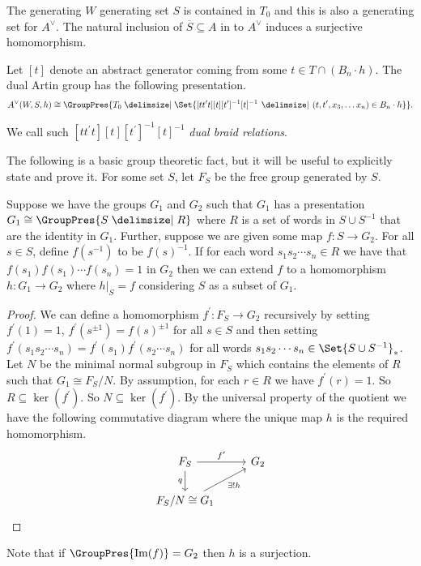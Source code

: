 \begin{theorem}
	The generating $W$ generating set $S$ is contained in $T_0$ and this is also a generating set for $A^\vee$.
	The natural inclusion of $\overline{S} \subseteq A$ in to $A^\vee$ induces a surjective homomorphism.
	\label{thm:homo_art_to_dual_art}
\end{theorem}

\begin{theorem}
	Let $[t]$ denote an abstract generator coming from some $t \in T \cap(B_n \cdot h)$.
	The dual Artin group has the following presentation.
	\[
		A^\vee(W,S,h) \cong \GroupPres{T_0 \relations \Set{ [t t^\prime t][t][t^\prime]^{-1}[t]^{-1} \given (t,t^\prime,x_3, \ldots x_n) \in B_n \cdot h}}
		.\]
	\label{thm:dual_braid_relations}
\end{theorem}

We call such $[t t^\prime t][t][t^\prime]^{-1}[t]^{-1}$ \emph{dual braid relations}.

The following is a basic group theoretic fact, but it will be useful to explicitly state and prove it.
For some set $S$, let $F_S$ be the free group generated by $S$.
\begin{lemma}
	Suppose we have the groups $G_1$ and $G_2$ such that $G_1$ has a presentation $G_1 \cong \GroupPres{S \relations R}$ where $R$ is a set of words in $S \cup S^{-1}$ that are the identity in $G_1$.
	Further, suppose we are given some map $f \colon S \to G_2$.
	For all $s \in S$, define $f(s^{-1})$ to be $f(s)^{-1}$.
	If for each word $s_1s_2 \cdots s_n \in R$ we have that $f(s_1)f(s_1)\cdots f(s_n) = 1$ in $G_2$ then we can extend $f$ to a homomorphism  $h \colon G_1 \to G_2$ where $h|_{S} = f$ considering $S$ as a subset of $G_1$.
	\label{lem:extend_map_to_homomorphism}
\end{lemma}
\begin{proof}
	We can define a homomorphism $f^\prime \colon F_{S} \to G_2$ recursively by setting $f^\prime(1) =1$, $f^\prime(s^{\pm 1}) = f(s)^{\pm 1}$ for all $s \in S$ and then setting $f^\prime(s_1s_2 \cdots s_n) = f^\prime(s_1)f^\prime(s_2\cdots s_n)$ for all words $s_1s_2\cdots s_n \in \Set{S \cup S^{-1}}_*$.
	Let $N$ be the minimal normal subgroup in $F_{S}$ which contains the elements of $R$ such that $G_1 \cong F_{S}/N$.
	By assumption, for each $r \in R$ we have $f^\prime(r) = 1$.
	So $R \subseteq \ker(f^\prime)$.
	So $N \subseteq \ker(f^\prime)$.
	By the universal property of the quotient we have the following commutative diagram where the unique map $h$ is the required homomorphism.
	\begin{equation*}
		\begin{tikzcd}
			F_{S} \ar[r, "f^\prime"] \ar[d, "q"'] &G_2 \\
			F_{S}/N \cong G_1 \ar[ru, "\exists ! h"']
		\end{tikzcd}
	\end{equation*}
\end{proof}
Note that if $\GroupPres{\image(f)} = G_2$ then $h$ is a surjection.


